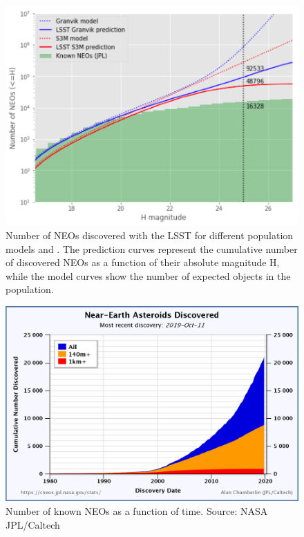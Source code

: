 \begin{figure}[tb!]
\begin{center}
\includegraphics[width=0.65\linewidth]{figs/neo1.png}
\end{center}
\caption{Number of NEOs discovered with the \gls{LSST} for different population models \citep[S3M,][]{s3m} and \citet{granvik2018neos}. 
The prediction curves represent the cumulative number of discovered NEOs as a function of their absolute magnitude H, while the model curves show the number of expected objects in the population.}
\label{fig:neo_count}       %
\end{figure}

\begin{figure}[tb!]
\begin{center}
\includegraphics[width=0.65\linewidth]{figs/nea_vs_time_chart.png}
\end{center}
\caption{Number of known NEOs as a function of time. \gls{Source}: \gls{NASA} \gls{JPL}/Caltech}
\label{fig:neo_current}       %
\end{figure}

\clearpage

